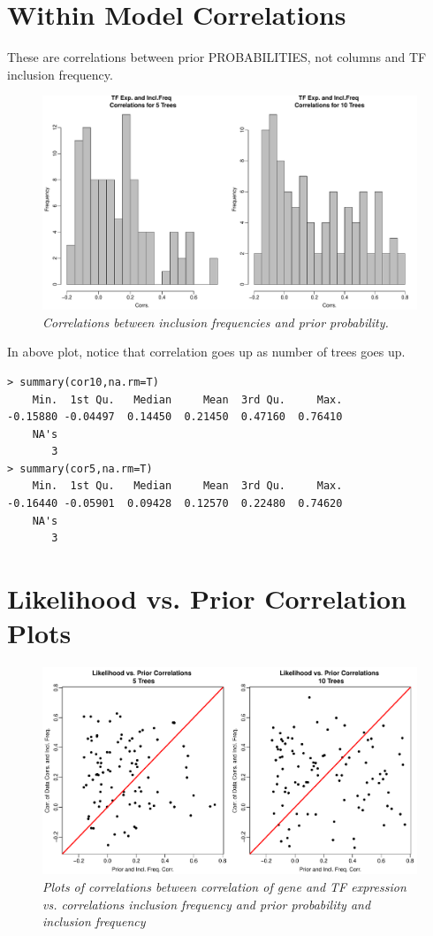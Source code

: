 \documentclass[12pt]{article}
\begin{document}
\section*{Within Model Correlations}
These are correlations between prior PROBABILITIES, not columns and TF inclusion frequency. 
\begin{figure}[H]
\centerline{\includegraphics[scale=.6]{inclTFcor.pdf}}
\caption{\it Correlations between inclusion frequencies and prior probability.}
\label{fig:version1}  
\end{figure}
In above plot, notice that correlation goes up as number of trees goes up.
\begin{verbatim}
> summary(cor10,na.rm=T)
    Min.  1st Qu.   Median     Mean  3rd Qu.     Max. 
-0.15880 -0.04497  0.14450  0.21450  0.47160  0.76410 
    NA's 
       3 
> summary(cor5,na.rm=T)
    Min.  1st Qu.   Median     Mean  3rd Qu.     Max. 
-0.16440 -0.05901  0.09428  0.12570  0.22480  0.74620 
    NA's 
       3 
\end{verbatim}



\section{Likelihood vs. Prior Correlation Plots }

\begin{figure}[H]
\centerline{\includegraphics[scale=.6]{shanePrior.pdf}}
\caption{\it Plots of correlations between correlation of gene and TF expression vs. correlations inclusion frequency and prior probability and inclusion frequency}
\label{fig:version1}  
\end{figure}
\end{document}
